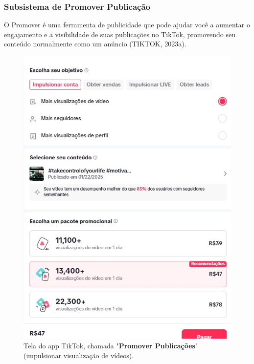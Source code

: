 \newpage
\subsubsection{Subsistema de Promover Publicação}

O Promover é uma ferramenta de publicidade que pode ajudar você a aumentar o engajamento e a visibilidade de suas publicações no TikTok, promovendo seu conteúdo normalmente como um anúncio (TIKTOK, 2023a).



\begin{figure}[H]
    \centering
    \begin{minipage}{0.45\textwidth}
        \centering
        \includegraphics[width=\linewidth]{Relatório/Figuras/promover_publicação1.jpg}
        \caption{Tela do app TikTok, chamada "\textbf{Promover Publicações}" (impulsionar visualização de vídeos).}
        \label{fig:promover_publicacao1}
    \end{minipage}\hfill

\end{figure}
